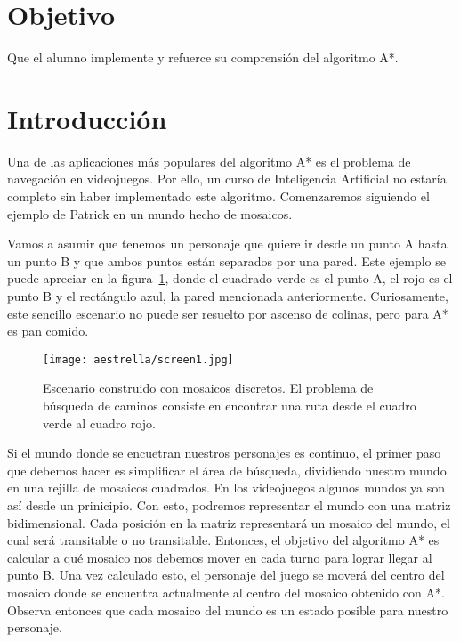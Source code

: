 
\section{Objetivo}

Que el alumno implemente y refuerce su comprensión del algoritmo A*.

\section{Introducci\'on}

Una de las aplicaciones más populares del algoritmo A* es el problema de navegación en videojuegos.  Por ello, un curso de Inteligencia Artificial no estaría completo sin haber implementado este algoritmo.  Comenzaremos siguiendo el ejemplo de Patrick \cite{Lester2003} en un mundo hecho de mosaicos.

Vamos a asumir que tenemos un personaje que quiere ir desde un punto A hasta un punto B y que ambos puntos están separados por una pared. Este ejemplo se puede apreciar en la figura~\ref{fig:fig1P4}, donde el cuadrado verde es el punto A, el rojo es el punto B y el rectángulo azul, la pared mencionada anteriormente.  Curiosamente, este sencillo escenario no puede ser resuelto por ascenso de colinas, pero para A* es pan comido.

\begin{figure}
  \centering
  \texttt{[image: aestrella/screen1.jpg]}
  \caption{Escenario construido con mosaicos discretos. El problema de búsqueda de caminos consiste en encontrar una ruta desde el cuadro verde al cuadro rojo.}
  \label{fig:fig1P4}
\end{figure}

Si el mundo donde se encuetran nuestros personajes es continuo, el primer paso que debemos hacer es simplificar el área de búsqueda, dividiendo nuestro mundo en una rejilla de mosaicos cuadrados.  En los videojuegos algunos mundos ya son así desde un prinicipio. Con esto, podremos representar el mundo con una matriz bidimensional. Cada posición en la matriz representará un mosaico del mundo, el cual será transitable o no transitable. Entonces, el objetivo del algoritmo A* es calcular a qué mosaico nos debemos mover en cada turno para lograr llegar al punto B. Una vez calculado esto, el personaje del juego se moverá del centro del mosaico donde se encuentra actualmente al centro del mosaico obtenido con A*.  Observa entonces que cada mosaico del mundo es un estado posible para nuestro personaje.

